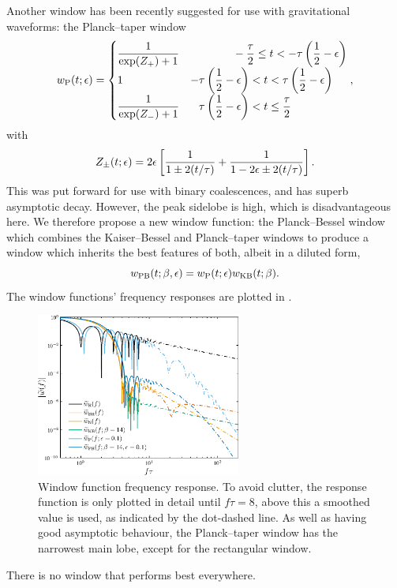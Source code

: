 Another window has been recently suggested for use with gravitational waveforms: the Planck--taper window \citep{Damour2000,McKechan2010}
\begin{equation}
w\sub{P}(t; \epsilon) = \begin{cases}
 {\displaystyle \recip{\exp(Z_+)+1}} & {\displaystyle \hphantom{\left(\recip{2} - \epsilon\right)}-\frac{\tau}{2} \leq t < -\tau\left(\recip{2} - \epsilon\right)} \\
 1 & {\displaystyle -\tau\left(\recip{2} - \epsilon\right) < t < \tau\left(\recip{2} - \epsilon\right)} \\
 {\displaystyle \recip{\exp(Z_-)+1}} & {\displaystyle \hphantom{-}\tau\left(\recip{2} - \epsilon\right) < t \leq \frac{\tau}{2}}
\end{cases},
\end{equation}
with
\begin{equation}
Z_\pm(t; \epsilon) = 2\epsilon\left[\frac{1}{1 \pm 2(t/\tau)} + \frac{1}{1 - 2\epsilon \pm 2(t/\tau)}\right].
\end{equation}
This was put forward for use with binary coalescences, and has superb asymptotic decay. However, the peak sidelobe is high, which is disadvantageous here. We therefore propose a new window function: the Planck--Bessel window which combines the Kaiser--Bessel and Planck--taper windows to produce a window which inherits the best features of both, albeit in a diluted form,
\begin{equation}
w_\mathrm{PB}(t;\beta,\epsilon) = w_\mathrm{P}(t; \epsilon)w_\mathrm{KB}(t;\beta).
\end{equation}
The window functions' frequency responses are plotted in .
\begin{figure}
  \centering
  \includegraphics[width=0.6\textwidth]{./images/Fig_Response}
    \caption{Window function frequency response. To avoid clutter, the response function is only plotted in detail until $f\tau = 8$, above this a smoothed value is used, as indicated by the dot-dashed line. As well as having good asymptotic behaviour, the Planck--taper window has the narrowest main lobe, except for the rectangular window.}
    \label{fig:Response}
\end{figure}
There is no window that performs best everywhere.

